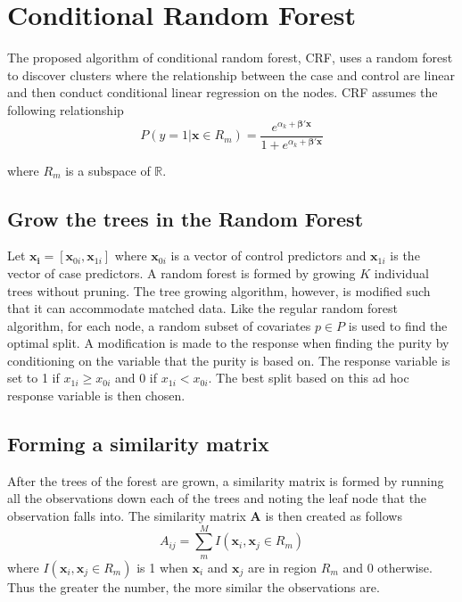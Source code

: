\documentclass[twoside,11pt]{article}
\begin{document}
\section{Conditional Random Forest}
The proposed algorithm of conditional random forest, CRF, uses a random forest to discover clusters where the relationship between the case and control are linear and then conduct conditional linear regression on the nodes. CRF assumes the following relationship
\begin{equation}
	P(y=1|\mathbf{x} \in R_m) = \frac{e^{\alpha_k + \mathbf{\beta}'\mathbf{x}}}{1+e^{\alpha_k + \mathbf{\beta}'\mathbf{x}}}
\end{equation}

where $R_m$ is a subspace of $\mathbb{R}$. 

\subsection{Grow the trees in the Random Forest}
Let $\mathbf{x_i}=[\mathbf{x}_{0i},\mathbf{x}_{1i}]$ where $\mathbf{x}_{0i}$ is a vector of control predictors and $\mathbf{x}_{1i}$ is the vector of case predictors. A random forest is formed by growing $K$ individual trees without pruning. The tree growing algorithm, however, is modified such that it can accommodate matched data. Like the regular random forest algorithm, for each node, a random subset of covariates $p\in P$ is used to find the optimal split. A modification is made to the response when finding the purity by conditioning on the variable that the purity is based on. The response variable is set to 1 if $x_{1i} \geq x_{0i}$ and 0 if $x_{1i} < x_{0i}$. The best split based on this ad hoc response variable is then chosen. 

\subsection{Forming a similarity matrix}
After the trees of the forest are grown, a similarity matrix is formed by running all the observations down each of the trees and noting the leaf node that the observation falls into. The similarity matrix $\mathbf{A}$ is then created as follows
\begin{equation}
	A_{ij}=\displaystyle\sum_m^M I(\mathbf{x}_i,\mathbf{x}_j \in R_m)
\end{equation}
where $I(\mathbf{x}_i,\mathbf{x}_j \in R_m)$ is 1 when $\mathbf{x}_i$ and $\mathbf{x}_j$ are in region $R_m$ and 0 otherwise. Thus the greater the number, the more similar the observations are. 
\end{document}
